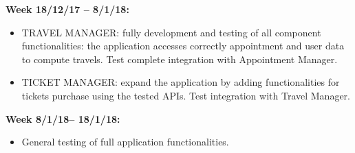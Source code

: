 \textbf{Week 18/12/17 – 8/1/18:}
\begin{itemize}
	\item TRAVEL MANAGER: fully development and testing of all component functionalities: the application accesses correctly appointment and user data to compute travels. Test complete integration with Appointment Manager.
	\item TICKET MANAGER: expand the application by adding functionalities for tickets purchase using the tested APIs. Test integration with Travel Manager.
\end{itemize}
\textbf{Week 8/1/18– 18/1/18:}
\begin{itemize}
	\item General testing of full application functionalities.
\end{itemize}